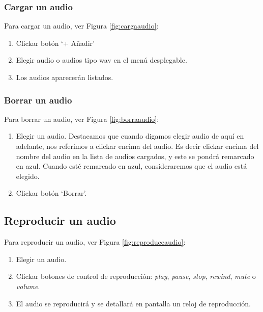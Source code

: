 \subsubsection{Cargar un audio}
Para cargar un audio, ver Figura \ref{fig:cargaaudio}:
\begin{enumerate}
\item Clickar botón `+ Añadir'
\item Elegir audio o audios tipo wav en el menú desplegable.
\item Los audios aparecerán listados.
\end{enumerate}


\subsubsection{Borrar un audio}
Para borrar un audio, ver Figura \ref{fig:borraaudio}:
\begin{enumerate}
\item Elegir un audio. Destacamos que cuando digamos elegir audio de aquí en adelante, nos referimos a clickar encima del audio. Es decir clickar encima del nombre del audio en la lista de audios cargados, y este se pondrá remarcado en azul. Cuando esté remarcado en azul, consideraremos que el audio está elegido.
\item Clickar botón `Borrar'.
\end{enumerate}



\subsection{Reproducir un audio}
Para reproducir un audio, ver Figura \ref{fig:reproduceaudio}:
\begin{enumerate}
\item Elegir un audio. 
\item Clickar botones de control de reproducción: \textit{play}, \textit{pause}, \textit{stop}, \textit{rewind}, \textit{mute} o \textit{volume}.
\item El audio se reproducirá y se detallará en pantalla un reloj de reproducción.
\end{enumerate}


